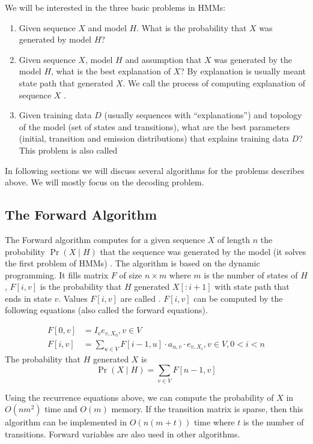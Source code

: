 We will be interested in the three basic problems in HMMs:
\begin{enumerate}
\item Given sequence $X$ and model $H$. What is the probability that $X$ was
generated by model $H$?
\item Given sequence $X$, model $H$ and assumption that $X$ was generated by the
model
$H$, what is the best explanation of $X$? By explanation is usually meant state
path that generated $X$. We call the process of computing explanation of
sequence $X$ .
\item Given training data $D$ (usually sequences with ``explanations'') and
topology of the model (set of states and transitions), what are the best parameters
(initial, transition and emission distributions) that explains training
data $D$? This problem is also called 
\end{enumerate} 
In following sections we will discuss several algorithms
for the problems describes above. We will mostly focus on the
decoding problem.


\subsection{The Forward Algorithm}
The Forward algorithm computes for a given sequence $X$ of
length $n$ the probability $\Pr\left(X\mid H\right)$ that the sequence was
generated by the model (it solves the first problem of HMMs) \cite{Durbin1998}. The algorithm is
based on the dynamic programming. It fills
matrix $F$ of size $n\times m$ where $m$ is the number of states of $H$, $F[i,v]$ is the probability that $H$
generated $X[:i+1]$ with state path that ends in state $v$. Values $F[i,v]$ are  called . $F[i,v]$ can be computed by the following equations (also called the
forward equations).

\begin{align}
F[0,v] &= I_ve_{v,X_0}, v\in V\\
F[i,v] &= \sum_{u\in V}F[i-1,u] \cdot a_{u,v} \cdot e_{v,X_i}, v\in V,0< i < n
\end{align}
The probability that $H$ generated $X$ is 
 \[\Pr\left(X\mid H\right) = \sum_{v\in V} F[n-1,v]\]

Using the recurrence equations above, we can compute the probability of $X$ in
$O(nm^2)$ time and $O(m)$ memory. If the transition
matrix is sparse, then this algorithm can be implemented in $O(n(m+t))$ time
where $t$ is the number of transitions.  Forward variables are also used in other
algorithms. 

